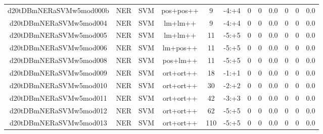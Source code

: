 \documentclass[a4paper]{article}
\begin{document}
\begin{landscape}
\begin{center}
\begin{tabular}{ |c|c|c|c|c|c|c|c|c|c|c|c|}
 
 	
 	\small{ d20tDBmNERaSVMw5mod000b } & \small{ NER} & \small{  SVM }  & pos+pos++  &  9 &  \small{  -4:+4 }  &  0 & 0 & 0.0  &  0 & 0 & 0.0 \\
 	

 
 	
 	\small{ d20tDBmNERaSVMw5mod004 } & \small{ NER} & \small{  SVM }  & lm+lm++  &  9 &  \small{  -4:+4 }  &  0 & 0 & 0.0  &  0 & 0 & 0.0 \\
 	

 
 	
 	\small{ d20tDBmNERaSVMw5mod005 } & \small{ NER} & \small{  SVM }  & lm+lm++  &  11 &  \small{  -5:+5 }  &  0 & 0 & 0.0  &  0 & 0 & 0.0 \\
 	

 
 	
 	\small{ d20tDBmNERaSVMw5mod006 } & \small{ NER} & \small{  SVM }  & lm+pos++  &  11 &  \small{  -5:+5 }  &  0 & 0 & 0.0  &  0 & 0 & 0.0 \\
 	

 
 	
 	\small{ d20tDBmNERaSVMw5mod008 } & \small{ NER} & \small{  SVM }  & pos+lm++  &  11 &  \small{  -5:+5 }  &  0 & 0 & 0.0  &  0 & 0 & 0.0 \\
 	

 
 	
 	\small{ d20tDBmNERaSVMw5mod009 } & \small{ NER} & \small{  SVM }  & ort+ort++  &  18 &  \small{  -1:+1 }  &  0 & 0 & 0.0  &  0 & 0 & 0.0 \\
 	

 
 	
 	\small{ d20tDBmNERaSVMw5mod010 } & \small{ NER} & \small{  SVM }  & ort+ort++  &  30 &  \small{  -2:+2 }  &  0 & 0 & 0.0  &  0 & 0 & 0.0 \\
 	

 
 	
 	\small{ d20tDBmNERaSVMw5mod011 } & \small{ NER} & \small{  SVM }  & ort+ort++  &  42 &  \small{  -3:+3 }  &  0 & 0 & 0.0  &  0 & 0 & 0.0 \\
 	

 
 	
 	\small{ d20tDBmNERaSVMw5mod012 } & \small{ NER} & \small{  SVM }  & ort+ort++  &  62 &  \small{  -5:+5 }  &  0 & 0 & 0.0  &  0 & 0 & 0.0 \\
 	

 
 	
 	\small{ d20tDBmNERaSVMw5mod013 } & \small{ NER} & \small{  SVM }  & ort+ort++  &  110 &  \small{  -5:+5 }  &  0 & 0 & 0.0  &  0 & 0 & 0.0 \\
 	


\end{tabular}
\end{center}
\end{landscape}
\end{document}
